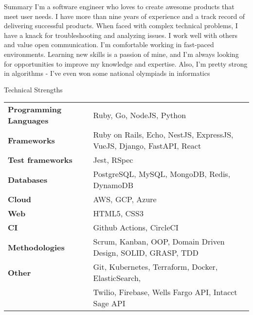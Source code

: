 \documentclass{resume}
\begin{document}
  \begin{rSection}{Summary}
    {I'm a software engineer who loves to create awesome products that meet user needs. I have more than nine years of experience and a track record of delivering successful products. When faced with complex technical problems, I have a knack for troubleshooting and analyzing issues. I work well with others and value open communication. I'm comfortable working in fast-paced environments. Learning new skills is a passion of mine, and I'm always looking for opportunities to improve my knowledge and expertise. Also, I'm pretty strong in algorithms - I've even won some national olympiads in informatics}
  \end{rSection}

  \begin{rSection}{Technical Strengths}
    \begin{tabular}{ @{} >{\bfseries}l @{\hspace{6ex}} l }
      Programming Languages & Ruby, Go, NodeJS, Python \\
      Frameworks            & Ruby on Rails, Echo, NestJS, ExpressJS, VueJS, Django, FastAPI, React \\
      Test frameworks       & Jest, RSpec \\
      Databases             & PostgreSQL, MySQL, MongoDB, Redis, DynamoDB \\
      Cloud                 & AWS, GCP, Azure \\
      Web                   & HTML5, CSS3 \\
      CI                    & Github Actions, CircleCI \\
      Methodologies         & Scrum, Kanban, OOP, Domain Driven Design, SOLID, GRASP, TDD \\
      Other                 & Git, Kubernetes, Terraform, Docker, ElasticSearch, \\
                            & Twilio, Firebase, Wells Fargo API, Intacct Sage API \\
    \end{tabular}
  \end{rSection}
\end{document}

